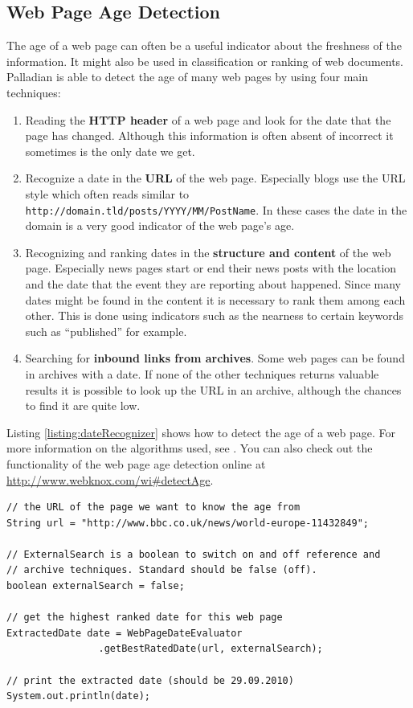 \subsection{Web Page Age Detection}
The age of a web page can often be a useful indicator about the freshness of the information. It might also be used in classification or ranking of web documents. Palladian is able to detect the age of many web pages by using four main techniques:
\begin{enumerate}
\item Reading the \textbf{ HTTP header} of a web page and look for the date that the page has changed. Although this information is often absent of incorrect it sometimes is the only date we get.
\item Recognize a date in the \textbf{ URL} of the web page. Especially blogs use the URL style which often reads similar to \texttt{http://domain.tld/posts/YYYY/MM/PostName}. In these cases the date in the domain is a very good indicator of the web page's age.
\item Recognizing and ranking dates in the \textbf{ structure and content} of the web page. Especially news pages start or end their news posts with the location and the date that the event they are reporting about happened. Since many dates might be found in the content it is necessary to rank them among each other. This is done using indicators such as the nearness to certain keywords such as ``published'' for example.
\item Searching for \textbf{ inbound links from archives}. Some web pages can be found in archives with a date. If none of the other techniques returns valuable results it is possible to look up the URL in an archive, although the chances to find it are quite low.
\end{enumerate}

Listing \ref{listing:dateRecognizer} shows how to detect the age of a web page. For more information on the algorithms used, see \cite{gregor2010bachelor}. You can also check out the functionality of the web page age detection online at \url{http://www.webknox.com/wi#detectAge}.

\begin{codelisting}
\begin{lstlisting}[label=listing:dateRecognizer,caption=Detecting the age of a web page.,frame=tb]
// the URL of the page we want to know the age from
String url = "http://www.bbc.co.uk/news/world-europe-11432849";

// ExternalSearch is a boolean to switch on and off reference and
// archive techniques. Standard should be false (off).
boolean externalSearch = false;

// get the highest ranked date for this web page
ExtractedDate date = WebPageDateEvaluator
				.getBestRatedDate(url, externalSearch);

// print the extracted date (should be 29.09.2010)
System.out.println(date);
\end{lstlisting}
\end{codelisting}

